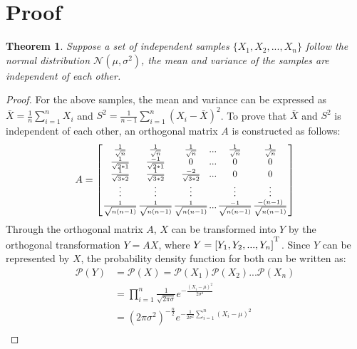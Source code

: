 \documentclass[letterpaper]{article} %
\begin{document}
\clearpage

\appendix
\section{Proof} \label{app:a}

\newtheorem{theorem}{Theorem}
\begin{theorem}
	Suppose a set of independent samples $\{X_1, X_2, ... ,X_n\}$ follow the normal distribution $\mathcal{N}(\mu, \sigma^2)$, the mean and variance of the samples are independent of each other.
\end{theorem}
\begin{proof}
	For the above samples, the mean and variance can be expressed as $\bar{X}=\frac{1}{n}\sum_{i=1}^{n}X_i$ and $S^2=\frac{1}{n-1}\sum_{i=1}^{n}(X_i-\bar{X})^2$. To prove that $\bar{X}$ and $S^2$ is independent of each other, an orthogonal matrix $A$ is constructed as follows:
	\begin{equation} \small  \setlength{\arraycolsep}{0.5pt}
		A = \left[ {\begin{array}{cccccc}
				\frac{1}{\sqrt{n}} & \frac{1}{\sqrt{n}} & \frac{1}{\sqrt{n}} & ... & \frac{1}{\sqrt{n}} & \frac{1}{\sqrt{n}} \\
				\frac{1}{\sqrt{2*1}} & \frac{-1}{\sqrt{2*1}} & 0 & ... & 0 & 0 \\
				\frac{1}{\sqrt{3*2}} & \frac{1}{\sqrt{3*2}} & \frac{-2}{\sqrt{3*2}} & ... & 0 & 0 \\
				\vdots & \vdots & \vdots & & \vdots & \vdots \\
				\frac{1}{\sqrt{n(n-1)}} & \frac{1}{\sqrt{n(n-1)}} & \frac{1}{\sqrt{n(n-1)}} & ... & \frac{-1}{\sqrt{n(n-1)}} & \frac{-(n-1)}{\sqrt{n(n-1)}} \\
		\end{array} } \right]
	\end{equation}
	Through the orthogonal matrix $A$, $X$ can be transformed into $Y$ by the orthogonal transformation $Y=AX$, where $Y=[Y_1, Y_2, ..., Y_n]^\textsuperscript{T}$. Since $Y$ can be represented by $X$, the probability density function for both can be written as:
	\begin{equation}
		\begin{array}{cl}
			\mathcal{P}(Y)&=\mathcal{P}(X)=\mathcal{P}(X_1)\mathcal{P}(X_2)...\mathcal{P}(X_n) \\
			&=\prod_{i=1}^{n}\frac{1}{\sqrt{2\pi \sigma}}e^{-\frac{(X_i-\mu)^2}{2\sigma^2}} \\
			&=(2\pi\sigma^2)^{-\frac{n}{2}}e^{-\frac{1}{2\sigma^2}\sum_{i=1}^{n}(X_i-\mu)^2} \\

\end{array}
\end{equation}
\end{proof}
\end{document}
